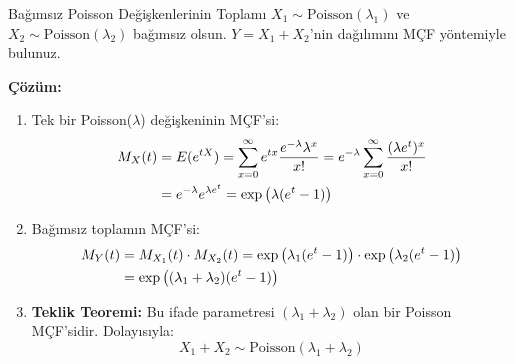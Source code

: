 \documentclass[12pt,a4paper]{article}
\begin{document}
\begin{ornek}{Bağımsız Poisson Değişkenlerinin Toplamı}
$X_1 \sim \text{Poisson}(\lambda_1)$ ve $X_2 \sim \text{Poisson}(\lambda_2)$ bağımsız olsun. $Y = X_1 + X_2$'nin dağılımını MÇF yöntemiyle bulunuz.

\bigskip
\textbf{Çözüm:}
\begin{enumerate}
    \item Tek bir Poisson($\lambda$) değişkeninin MÇF'si:
    \begin{align}
        M_X(t) &= E(e^{tX}) = \sum_{x=0}^\infty e^{tx} \frac{e^{-\lambda}\lambda^x}{x!} = e^{-\lambda} \sum_{x=0}^\infty \frac{(\lambda e^t)^x}{x!} \notag \\
        &= e^{-\lambda} e^{\lambda e^t} = \exp\left( \lambda(e^t - 1) \right)
    \end{align}
    \item Bağımsız toplamın MÇF'si:
    \begin{align}
        M_Y(t) &= M_{X_1}(t) \cdot M_{X_2}(t) = \exp\left(\lambda_1(e^t - 1)\right) \cdot \exp\left(\lambda_2(e^t - 1)\right) \notag \\
        &= \exp\left( (\lambda_1 + \lambda_2)(e^t - 1) \right)
    \end{align}
    \item \textbf{Teklik Teoremi:} Bu ifade parametresi $(\lambda_1 + \lambda_2)$ olan bir Poisson MÇF'sidir. Dolayısıyla:
    \begin{equation}
        \boxed{X_1 + X_2 \sim \text{Poisson}(\lambda_1 + \lambda_2)}
    \end{equation}
\end{enumerate}
\end{ornek}
\end{document}
